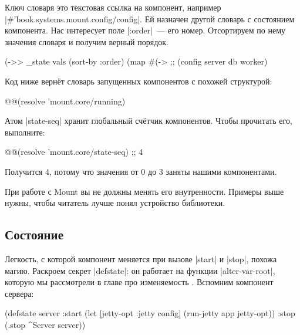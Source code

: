 Ключ словаря это текстовая ссылка на компонент, например
\spverb|#'book.systems.mount.config/config|. Ей назначен другой словарь с
состоянием компонента. Нас интересует поле \spverb|:order|~--- его
номер. Отсортируем по нему значения словаря и получим верный порядок.

\begin{english}
  \begin{clojure}
(->> _state
     vals
     (sort-by :order)
     (map #(-> %
;; (config server db worker)
  \end{clojure}
\end{english}

Код ниже верн\"{е}т словарь запущенных компонентов с похожей структурой:

\begin{english}
  \begin{clojure}
@@(resolve 'mount.core/running)
  \end{clojure}
\end{english}

Атом \spverb|state-seq| хранит глобальный сч\"{е}тчик компонентов. Чтобы прочитать
его, выполните:

\begin{english}
  \begin{clojure}
@@(resolve 'mount.core/state-seq) ;; 4
  \end{clojure}
\end{english}

\noindent
Получится 4, потому что значения от 0 до 3 заняты нашими компонентами.

При работе с Mount вы не должны менять его внутренности. Примеры выше нужны,
чтобы читатель лучше понял устройство библиотеки.

\subsection{Состояние}

Легкость, с которой компонент меняется при вызове \spverb|start| и
\spverb|stop|, похожа магию. Раскроем секрет \spverb|defstate|: он работает на
функции \spverb|alter-var-root|, которую мы рассмотрели в главе про
изменяемость . Вспомним компонент сервера:

\begin{english}
  \begin{clojure}
(defstate server
  :start (let [{jetty-opt :jetty} config]
           (run-jetty app jetty-opt))
  :stop (.stop ^Server server))
  \end{clojure}
\end{english}

